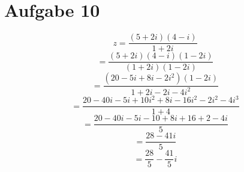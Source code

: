 \section{Aufgabe 10}
$$z = \frac{(5+2i)(4-i)}{1+2i}$$
$$= \frac{(5+2i)(4-i)(1-2i)}{(1+2i)(1-2i)}$$
$$= \frac{(20-5i+8i-2i^2)(1-2i)}{1+2i-2i-4i^2}$$
$$= \frac{20-40i-5i+10i^2+8i-16i^2-2i^2-4i^3}{1+4}$$
$$= \frac{20-40i-5i-10+8i+16+2-4i}{5}$$
$$= \frac{28-41i}{5}$$
$$= \frac{28}{5}-\frac{41}{5}i$$